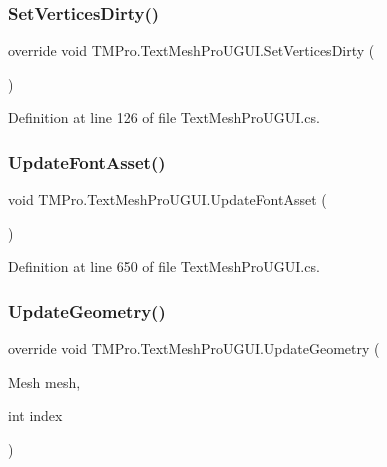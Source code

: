 \subsubsection{\texorpdfstring{SetVerticesDirty()}{SetVerticesDirty()}}
{\footnotesize\ttfamily override void T\+M\+Pro.\+Text\+Mesh\+Pro\+U\+G\+U\+I.\+Set\+Vertices\+Dirty (\begin{DoxyParamCaption}{ }\end{DoxyParamCaption})}



Definition at line 126 of file Text\+Mesh\+Pro\+U\+G\+U\+I.\+cs.

\mbox{\label{class_t_m_pro_1_1_text_mesh_pro_u_g_u_i_ac38b46e6697cbc9e1f8ba43350e97469}} 
\subsubsection{\texorpdfstring{UpdateFontAsset()}{UpdateFontAsset()}}
{\footnotesize\ttfamily void T\+M\+Pro.\+Text\+Mesh\+Pro\+U\+G\+U\+I.\+Update\+Font\+Asset (\begin{DoxyParamCaption}{ }\end{DoxyParamCaption})}



Definition at line 650 of file Text\+Mesh\+Pro\+U\+G\+U\+I.\+cs.

\mbox{\label{class_t_m_pro_1_1_text_mesh_pro_u_g_u_i_a111121630f131c81af75f55f31e392e2}} 
\subsubsection{\texorpdfstring{UpdateGeometry()}{UpdateGeometry()}}
{\footnotesize\ttfamily override void T\+M\+Pro.\+Text\+Mesh\+Pro\+U\+G\+U\+I.\+Update\+Geometry (\begin{DoxyParamCaption}\item[{Mesh}]{mesh,  }\item[{int}]{index }\end{DoxyParamCaption})\hspace{0.3cm}{\ttfamily [virtual]}}




